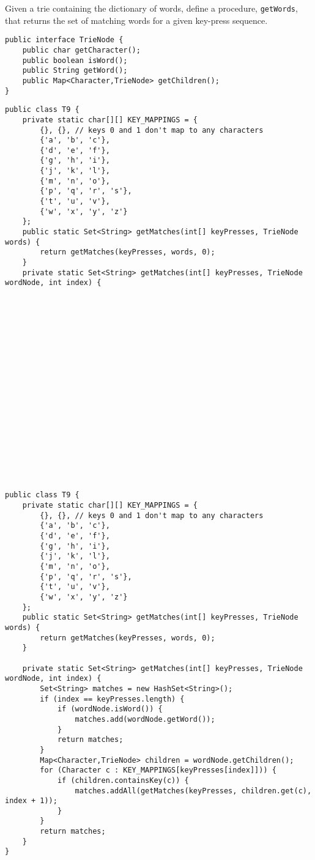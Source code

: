 Given a trie containing the dictionary of words, 
define a procedure, \texttt{getWords}, that returns the set of matching words for a given key-press sequence.

\begin{lstlisting}
public interface TrieNode {
    public char getCharacter();
    public boolean isWord();
    public String getWord();
    public Map<Character,TrieNode> getChildren();
}
\end{lstlisting}

\ifprintanswers\else
\begin{lstlisting}
public class T9 {
    private static char[][] KEY_MAPPINGS = {
        {}, {}, // keys 0 and 1 don't map to any characters
        {'a', 'b', 'c'},
        {'d', 'e', 'f'},
        {'g', 'h', 'i'},
        {'j', 'k', 'l'},
        {'m', 'n', 'o'},
        {'p', 'q', 'r', 's'},
        {'t', 'u', 'v'},
        {'w', 'x', 'y', 'z'}
    };
    public static Set<String> getMatches(int[] keyPresses, TrieNode words) {
        return getMatches(keyPresses, words, 0);
    }
    private static Set<String> getMatches(int[] keyPresses, TrieNode wordNode, int index) {




















\end{lstlisting}
\fi

\begin{solution}
\begin{lstlisting}
public class T9 {
    private static char[][] KEY_MAPPINGS = {
        {}, {}, // keys 0 and 1 don't map to any characters
        {'a', 'b', 'c'},
        {'d', 'e', 'f'},
        {'g', 'h', 'i'},
        {'j', 'k', 'l'},
        {'m', 'n', 'o'},
        {'p', 'q', 'r', 's'},
        {'t', 'u', 'v'},
        {'w', 'x', 'y', 'z'}
    };
    public static Set<String> getMatches(int[] keyPresses, TrieNode words) {
        return getMatches(keyPresses, words, 0);
    }

    private static Set<String> getMatches(int[] keyPresses, TrieNode wordNode, int index) {
        Set<String> matches = new HashSet<String>();
        if (index == keyPresses.length) {
            if (wordNode.isWord()) {
                matches.add(wordNode.getWord());
            }
            return matches;
        }
        Map<Character,TrieNode> children = wordNode.getChildren();
        for (Character c : KEY_MAPPINGS[keyPresses[index]])) {
            if (children.containsKey(c)) {
                matches.addAll(getMatches(keyPresses, children.get(c), index + 1));
            }
        }
        return matches;
    }
}
\end{lstlisting}
\end{solution}